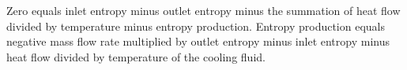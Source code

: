 Zero equals inlet entropy minus outlet entropy minus the summation of heat flow divided by temperature minus entropy production.  
Entropy production equals negative mass flow rate multiplied by outlet entropy minus inlet entropy minus heat flow divided by temperature of the cooling fluid.